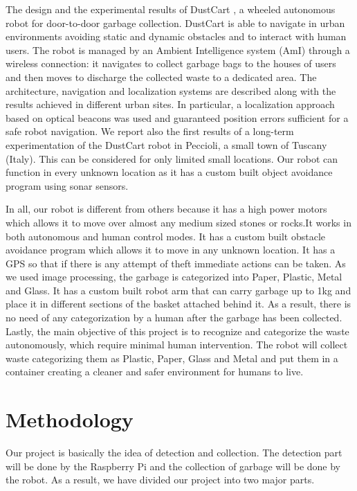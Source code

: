 \documentclass[conference]{IEEEtran}
\begin{document}
	The design and the experimental results of DustCart \cite{b4} , a wheeled autonomous robot for door-to-door garbage collection. DustCart is able to navigate in urban environments avoiding static and dynamic obstacles and to interact with human users. The robot is managed by an Ambient Intelligence system (AmI) through a wireless connection: it navigates to collect garbage bags to the houses of users and then moves to discharge the collected waste to a dedicated area. The architecture, navigation and localization systems are described along with the results achieved in different urban sites. In particular, a localization approach based on optical beacons was used and guaranteed position errors sufficient for a safe robot navigation. We report also the first results of a long-term experimentation of the DustCart \cite{b4} robot in Peccioli, a small town of Tuscany (Italy). This can be considered for only limited small locations. Our robot can function in every unknown location as it has a custom built object avoidance program using sonar sensors.
	
	In all, our robot is different from others because it has a high power motors which allows it to move over almost any medium sized stones or rocks.It works in both autonomous and human control modes. It has a custom built obstacle avoidance program which allows it to move in any unknown location. It has a GPS so that if there is any attempt of theft immediate actions can be taken. As we used image processing, the garbage is categorized into Paper, Plastic, Metal and Glass. It has a custom built robot arm that can carry garbage up to 1kg and place it in different sections of the basket attached behind it. As a result, there is no need of any categorization by a human after the garbage has been collected. Lastly, the main objective of this project is to recognize and categorize the waste autonomously, which require minimal human intervention. The robot will collect waste categorizing them as Plastic, Paper, Glass and Metal and put them in a container creating a cleaner and safer environment for humans to live. 
	
	
	
	\section{Methodology}
	Our project is basically the idea of detection and collection. The detection part will be done by the Raspberry Pi and the collection of garbage will be done by the robot. As a result, we have divided our project into two major parts.
	
\end{document}
